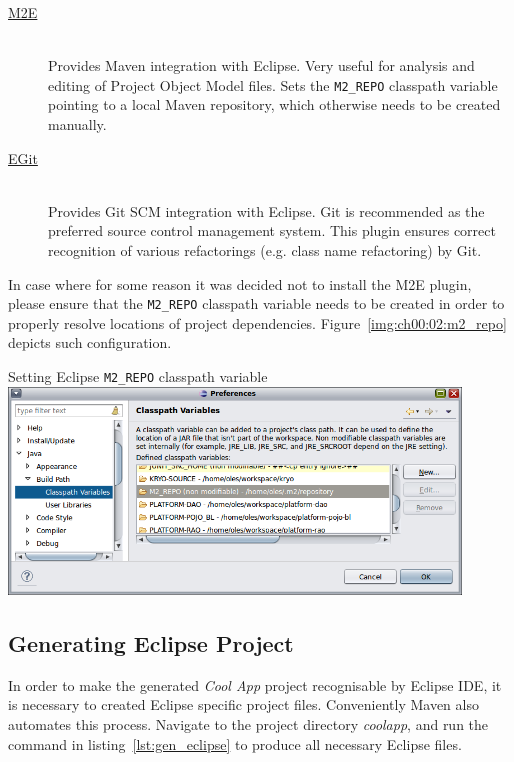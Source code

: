   \begin{description}
    \item[\href{http://www.eclipse.org/m2e/}{M2E}] \hfill \\
	Provides Maven integration with Eclipse. 
	Very useful for analysis and editing of Project Object Model files.
	Sets the \texttt{M2\_REPO} classpath variable pointing to a local Maven repository, which otherwise needs to be created manually.
    \item[\href{http://www.eclipse.org/egit/}{EGit}] \hfill \\
	Provides Git SCM integration with Eclipse. 
	Git is recommended as the preferred source control management system. 
	This plugin ensures correct recognition of various refactorings (e.g. class name refactoring) by Git.
  \end{description}

  In case where for some reason it was decided not to install the M2E plugin, please ensure that the \texttt{M2\_REPO} classpath variable needs to be created in order to properly resolve locations of project dependencies. 
  Figure~\ref{img:ch00:02:m2_repo} depicts such configuration.

  \begin{image}{Setting Eclipse \texttt{M2\_REPO} classpath variable}{\label{img:ch00:02:m2_repo}}    
    \includegraphics[width=0.9\textwidth]{parts/00-part/chapters/01-application-modules/images/06-eclipse-m2-variable.png}
  \end{image}

\subsection{Generating Eclipse Project}

  In order to make the generated \emph{Cool App} project recognisable by Eclipse IDE, it is necessary to created Eclipse specific project files.
  Conveniently Maven also automates this process.
  Navigate to the project directory \emph{coolapp}, and run the command in listing~\ref{lst:gen_eclipse} to produce all necessary Eclipse files.
  
